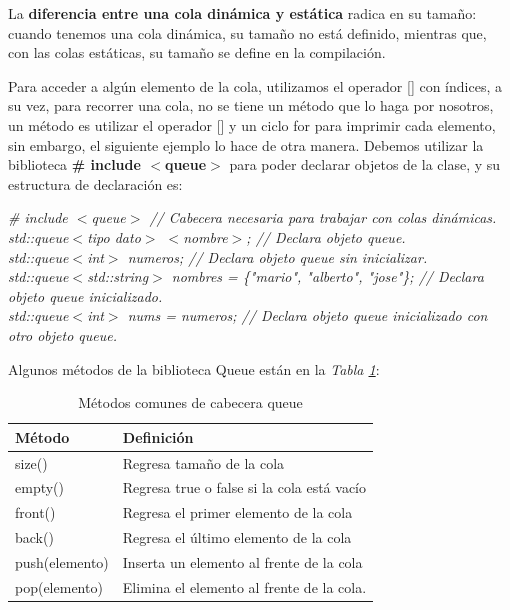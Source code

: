 La \textbf{diferencia entre una cola dinámica y estática} radica en su tamaño: cuando tenemos una cola dinámica, su tamaño no está definido, mientras que, con las colas estáticas, su tamaño se define en la compilación.

Para acceder a algún elemento de la cola, utilizamos el operador [] con índices, a su vez, para recorrer una cola, no se tiene un método que lo haga por nosotros, un método es utilizar el operador [] y un ciclo for para imprimir cada elemento, sin embargo, el siguiente ejemplo lo hace de otra manera. Debemos utilizar la biblioteca \textbf{\# include $<$queue$>$} para poder declarar objetos de la clase, y su estructura de declaración es:
\begin{center}
	\textit{
		\# include $<$queue$>$ // Cabecera necesaria para trabajar con colas dinámicas. \\
		std::queue$<$tipo dato$>$ $<$nombre$>$; // Declara objeto queue. \\
		std::queue$<$int$>$ numeros; // Declara objeto queue sin inicializar. \\
		std::queue$<$std::string$>$ nombres = \{"mario", "alberto", "jose"\}; // Declara objeto queue inicializado. \\
		std::queue$<$int$>$ nums = numeros; // Declara objeto queue inicializado con otro objeto queue.
	}
\end{center}

Algunos métodos de la biblioteca Queue están en la \textit{Tabla \ref{tab: 11}}:
\begin{table}[H]
    \begin{center}
        \caption{Métodos comunes de cabecera queue}
        \label{tab: 11}
        \begin{tabular}{l | l}
            \hline
            \textbf{Método} & \textbf{Definición} \\
            \hline
            size()			& Regresa tamaño de la cola \\
            empty()			& Regresa true o false si la cola está vacío \\
            front()			& Regresa el primer elemento de la cola \\
            back()			& Regresa el último elemento de la cola \\
            push(elemento)	& Inserta un elemento al frente de la cola \\
            pop(elemento)	& Elimina el elemento al frente de la cola. \\
            \hline
        \end{tabular}
    \end{center}
\end{table}

